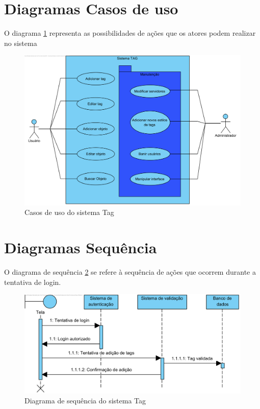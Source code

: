 \section{Diagramas Casos de uso}
    O diagrama \ref{DiagUso} representa as possibilidades de ações que os atores podem realizar no sistema
    \begin{figure}[H]
        \begin{center}
            \includegraphics[width=12cm]{Pictures/JV/Diagramas/Sistema Tag - Casos de uso.png}
            \caption{Casos de uso do sistema Tag} \label{DiagUso}
        \end{center}
    \end{figure} 


\section{Diagramas Sequência}
    O diagrama de sequência \ref{DiagSeq} se refere à sequência de ações que ocorrem durante a tentativa de login.
    \begin{figure}[H]
        \begin{center}
            \includegraphics[width=12cm]{Pictures/JV/Diagramas/Sistema Tag - Diagrama de Sequencia.png}
            \caption{Diagrama de sequência do sistema Tag} \label{DiagSeq}
        \end{center}
    \end{figure} 

